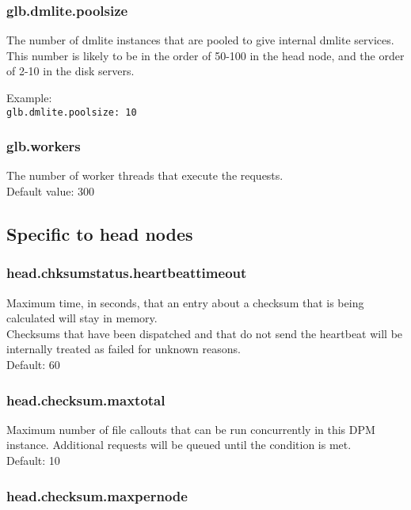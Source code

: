 \documentclass[a4paper,10pt]{scrreprt}
\begin{document}
\subsubsection{glb.dmlite.poolsize}

The number of dmlite instances that are pooled to give internal dmlite services. This number is likely to be in the order of 50-100 in the head node, and the order of 2-10 in the disk servers.

 Example:\\
\lstinline"glb.dmlite.poolsize: 10"\\

\subsubsection{glb.workers}

The number of worker threads that execute the requests.\\
Default value: 300\\




\subsection{Specific to head nodes}

\subsubsection{head.chksumstatus.heartbeattimeout}
Maximum time, in seconds, that an entry about a checksum that is being calculated will stay in memory.\\
Checksums that have been dispatched and that do not send the heartbeat will be internally treated as failed for unknown reasons.\\
Default: 60\\

\subsubsection{head.checksum.maxtotal}

Maximum number of file callouts that can be run concurrently in this DPM instance. Additional requests will be queued until the condition is met.\\
Default: 10\\

\subsubsection{head.checksum.maxpernode}
\end{document}
